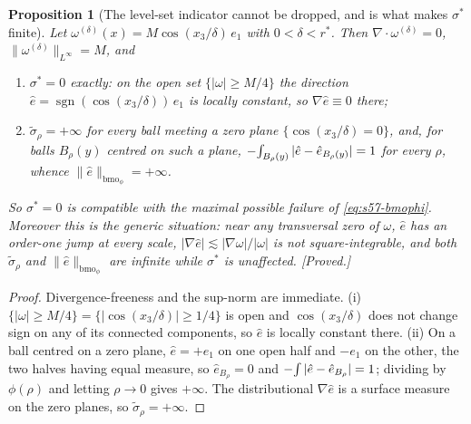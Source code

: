 \documentclass[11pt]{article}
\newtheorem{proposition}[theorem]{Proposition}
\theoremstyle{definition}
\theoremstyle{remark}
\newcommand{\Xint}{\mathop{\mathchoice{\vcenter{\hbox{$\displaystyle-$}}}%
  {\vcenter{\hbox{$\textstyle-$}}}%
  {\vcenter{\hbox{$\scriptstyle-$}}}%
  {\vcenter{\hbox{$\scriptscriptstyle-$}}}}\!\int}
\providecommand{\fint}{\Xint}
\begin{document}
\begin{proposition}[The level-set indicator cannot be dropped, and is what
  makes $\sigma^*$ finite]\label{prop:s57-indicator}
  Let $\omega^{(\delta)}(x)=M\cos(x_3/\delta)\,e_1$ with
  $0<\delta<r^*$. Then $\nabla\cdot\omega^{(\delta)}=0$,
  $\|\omega^{(\delta)}\|_{L^\infty}=M$, and
  \begin{enumerate}[label=\textup{(\roman*)},leftmargin=2.6em]
  \item $\sigma^*=0$ exactly: on the open set $\{|\omega|\geq M/4\}$ the
    direction $\hat e=\operatorname{sgn}(\cos(x_3/\delta))\,e_1$ is locally
    constant, so $\nabla\hat e\equiv0$ there;
  \item $\tilde\sigma_\rho=+\infty$ for every ball meeting a zero plane
    $\{\cos(x_3/\delta)=0\}$, and, for balls $B_\rho(y)$ centred on such a
    plane, $\fint_{B_\rho(y)}|\hat e-\hat e_{B_\rho(y)}|=1$ for
    \emph{every} $\rho$, whence
    $\|\hat e\|_{\mathrm{bmo}_\phi}=+\infty$.
  \end{enumerate}
  So $\sigma^*=0$ is compatible with the maximal possible failure of
  \eqref{eq:s57-bmophi}. Moreover this is the generic situation: near any
  transversal zero of $\omega$, $\hat e$ has an order-one jump at every scale,
  $|\nabla\hat e|\lesssim|\nabla\omega|/|\omega|$ is not square-integrable,
  and both $\tilde\sigma_\rho$ and $\|\hat e\|_{\mathrm{bmo}_\phi}$ are
  infinite while $\sigma^*$ is unaffected. \emph{[Proved.]}
\end{proposition}
\begin{proof}
  Divergence-freeness and the sup-norm are immediate. (i) $\{|\omega|\geq
  M/4\}=\{|\cos(x_3/\delta)|\geq1/4\}$ is open and $\cos(x_3/\delta)$ does not
  change sign on any of its connected components, so $\hat e$ is locally
  constant there. (ii) On a ball centred on a zero plane, $\hat e=+e_1$ on one
  open half and $-e_1$ on the other, the two halves having equal measure, so
  $\hat e_{B_\rho}=0$ and $\fint|\hat e-\hat e_{B_\rho}|=1$; dividing by
  $\phi(\rho)$ and letting $\rho\to0$ gives $+\infty$. The
  distributional $\nabla\hat e$ is a surface measure on the zero planes, so
  $\tilde\sigma_\rho=+\infty$.
\end{proof}
\end{document}
